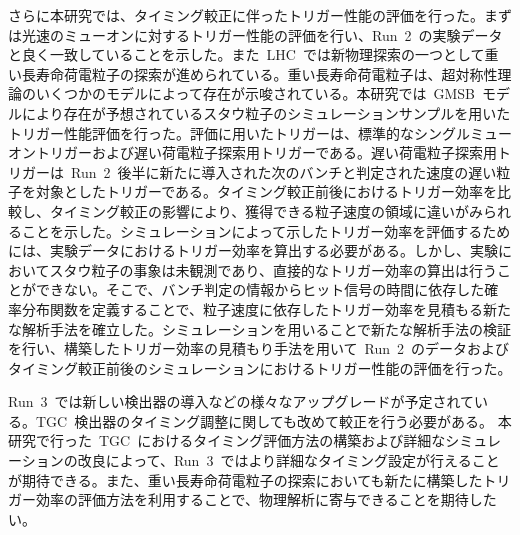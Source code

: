 さらに本研究では、タイミング較正に伴ったトリガー性能の評価を行った。まずは光速のミューオンに対するトリガー性能の評価を行い、Run~2~の実験データと良く一致していることを示した。また~LHC~では新物理探索の一つとして重い長寿命荷電粒子の探索が進められている。重い長寿命荷電粒子は、超対称性理論のいくつかのモデルによって存在が示唆されている。本研究では~GMSB~モデルにより存在が予想されているスタウ粒子のシミュレーションサンプルを用いたトリガー性能評価を行った。評価に用いたトリガーは、標準的なシングルミューオントリガーおよび遅い荷電粒子探索用トリガーである。遅い荷電粒子探索用トリガーは~Run~2~後半に新たに導入された次のバンチと判定された速度の遅い粒子を対象としたトリガーである。タイミング較正前後におけるトリガー効率を比較し、タイミング較正の影響により、獲得できる粒子速度の領域に違いがみられることを示した。シミュレーションによって示したトリガー効率を評価するためには、実験データにおけるトリガー効率を算出する必要がある。しかし、実験においてスタウ粒子の事象は未観測であり、直接的なトリガー効率の算出は行うことができない。そこで、バンチ判定の情報からヒット信号の時間に依存した確率分布関数を定義することで、粒子速度に依存したトリガー効率を見積もる新たな解析手法を確立した。シミュレーションを用いることで新たな解析手法の検証を行い、構築したトリガー効率の見積もり手法を用いて~Run~2~のデータおよびタイミング較正前後のシミュレーションにおけるトリガー性能の評価を行った。

Run~3~では新しい検出器の導入などの様々なアップグレードが予定されている。TGC~検出器のタイミング調整に関しても改めて較正を行う必要がある。
本研究で行った~TGC~におけるタイミング評価方法の構築および詳細なシミュレーションの改良によって、Run~3~ではより詳細なタイミング設定が行えることが期待できる。また、重い長寿命荷電粒子の探索においても新たに構築したトリガー効率の評価方法を利用することで、物理解析に寄与できることを期待したい。
